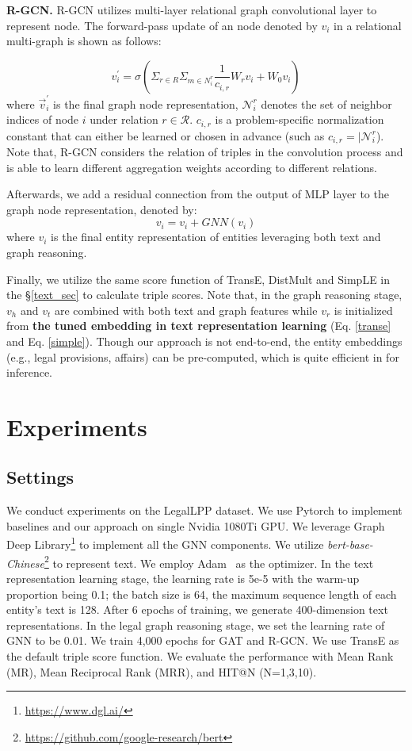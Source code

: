 \documentclass[runningheads]{llncs}
\begin{document}
\textbf{R-GCN.} R-GCN utilizes multi-layer relational graph convolutional layer to represent node. The forward-pass update of an node denoted by $v_i$ in a relational  multi-graph is shown as follows:

\begin{equation}
    v_{i}^{\prime}=\sigma\left(\Sigma_{r \in R} \Sigma_{m \in N_{i}^{r}} \frac{1}{c_{i, r}} W_{r} v_{i}+W_{0} v_{i}\right)
\end{equation}
where $\vec{v}_{i}^{\prime}$ is the final graph node representation, $\mathcal{N}_{i}^{r}$ denotes the set of neighbor indices of node $i$ under relation $r \in \mathcal{R}$. $c_{i,r}$ is a problem-specific normalization constant that can either be learned or chosen in advance
(such as $c_{i, r}=\mid \mathcal{N}_{i}^{r}$). Note that, R-GCN  considers the relation of triples in the convolution process and is able to learn different aggregation weights according to different relations.

Afterwards, we add a residual connection from the output of MLP layer to the graph node representation, denoted by:
\begin{equation}
    v_i = v_i + GNN(v_i)
\end{equation}
where $v_i$ is the final entity representation of entities  leveraging both text and graph reasoning. 

Finally, we utilize the same score function of TransE, DistMult and SimpLE in the \S \ref{text_sec} to calculate triple scores. Note that, in the graph reasoning stage, $v_{h}$ and $v_t$ are combined with  both text and graph features while $v_r$ is initialized  from \textbf{the  tuned embedding in  text representation learning} (Eq. \ref{transe} and Eq. \ref{simple}). 
Though our approach is not end-to-end, the  entity embeddings (e.g., legal provisions, affairs) can be pre-computed, which is quite efficient in for inference.


\section{Experiments}
\subsection{Settings}
We conduct experiments on the LegalLPP dataset.  We use Pytorch \cite{paszke2019pytorch} to implement baselines and our approach on single Nvidia 1080Ti GPU.  We leverage Graph Deep Library\footnote{\url{https://www.dgl.ai/}} to implement all the GNN components. We utilize \emph{bert-base-Chinese}\footnote{\url{https://github.com/google-research/bert}} to represent text. We employ Adam~\cite{Kingma2015AdamAM} as the optimizer. In the text representation learning stage, the learning rate is 5e-5 with the warm-up proportion being 0.1; the batch size is 64,  the maximum sequence length of each entity's text is 128.  After 6 epochs of training, we generate 400-dimension text representations. In the legal graph reasoning stage, we set the learning rate of GNN to be 0.01. We train 4,000 epochs for GAT and R-GCN. We use  TransE as the default triple score function. 
We evaluate the performance with Mean Rank (MR), Mean Reciprocal Rank (MRR), and HIT@N (N=1,3,10).  
\end{document}
